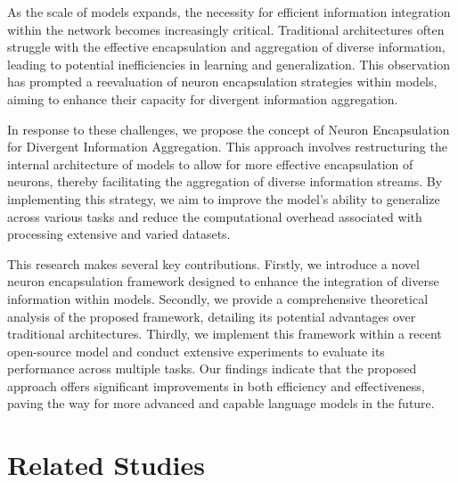 \documentclass{article}
\begin{document}
As the scale of models expands, the necessity for efficient information integration within the network becomes increasingly critical. Traditional architectures often struggle with the effective encapsulation and aggregation of diverse information, leading to potential inefficiencies in learning and generalization. This observation has prompted a reevaluation of neuron encapsulation strategies within models, aiming to enhance their capacity for divergent information aggregation.

In response to these challenges, we propose the concept of Neuron Encapsulation for Divergent Information Aggregation. This approach involves restructuring the internal architecture of models to allow for more effective encapsulation of neurons, thereby facilitating the aggregation of diverse information streams. By implementing this strategy, we aim to improve the model's ability to generalize across various tasks and reduce the computational overhead associated with processing extensive and varied datasets.

This research makes several key contributions. Firstly, we introduce a novel neuron encapsulation framework designed to enhance the integration of diverse information within models. Secondly, we provide a comprehensive theoretical analysis of the proposed framework, detailing its potential advantages over traditional architectures. Thirdly, we implement this framework within a recent open-source model and conduct extensive experiments to evaluate its performance across multiple tasks. Our findings indicate that the proposed approach offers significant improvements in both efficiency and effectiveness, paving the way for more advanced and capable language models in the future.




\section{Related Studies}
\end{document}
